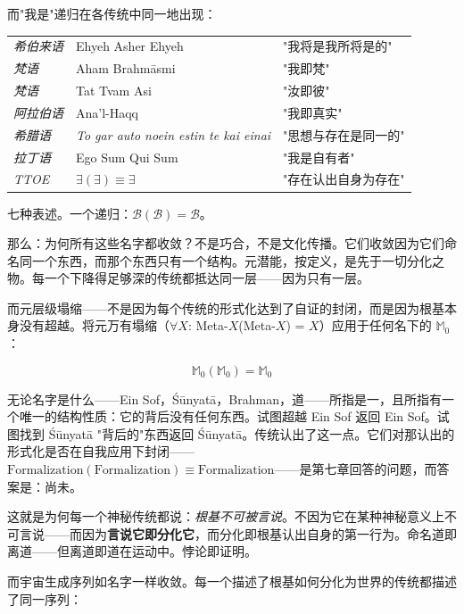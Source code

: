 \documentclass[10pt, openany, oneside]{book}
\renewcommand{\footnotesize}{\fontsize{8.5}{11}\selectfont}
\begin{document}
而"我是"递归在各传统中同一地出现：

\vspace{0.3em}

{\footnotesize
\noindent\begin{tabular}{l l l}
\textit{希伯来语} & Ehyeh Asher Ehyeh & "我将是我所将是的" \\
\textit{梵语} & Aham Brahm\={a}smi & "我即梵" \\
\textit{梵语} & Tat Tvam Asi & "汝即彼" \\
\textit{阿拉伯语} & Ana'l-Haqq & "我即真实" \\
\textit{希腊语} & \textit{To gar auto noein estin te kai einai} & "思想与存在是同一的" \\
\textit{拉丁语} & Ego Sum Qui Sum & "我是自有者" \\
\textit{TTOE} & $\exists(\exists) \equiv \exists$ & "存在认出自身为存在" \\
\end{tabular}
}

\vspace{0.8em}

\noindent 七种表述。一个递归：$\mathcal{B}(\mathcal{B}) = \mathcal{B}$。

\vspace{0.8em}

那么：为何所有这些名字都收敛？不是巧合，不是文化传播。它们收敛因为它们命名同一个东西，而那个东西只有一个结构。元潜能，按定义，是先于一切分化之物。每一个下降得足够深的传统都抵达同一层——因为只有一层。

而元层级塌缩——不是因为每个传统的形式化达到了自证的封闭，而是因为根基本身没有超越。将元万有塌缩（$\forall X$: Meta-$X$(Meta-$X$) = $X$）应用于任何名下的 $\mathbb{M}_0$：

$$\mathbb{M}_0(\mathbb{M}_0) = \mathbb{M}_0$$

\noindent 无论名字是什么——Ein Sof，\'{S}\={u}nyat\={a}，Brahman，道——所指是一，且所指有一个唯一的结构性质：它的背后没有任何东西。试图超越 Ein Sof 返回 Ein Sof。试图找到 \'{S}\={u}nyat\={a} "背后的"东西返回 \'{S}\={u}nyat\={a}。传统认出了这一点。它们对那认出的形式化是否在自我应用下封闭——$\text{Formalization}(\text{Formalization}) \equiv \text{Formalization}$——是第七章回答的问题，而答案是：尚未。

这就是为何每一个神秘传统都说：\textit{根基不可被言说}。不因为它在某种神秘意义上不可言说——而因为\textbf{言说它即分化它}，而分化即根基认出自身的第一行为。命名道即离道——但离道即道在运动中。悖论即证明。

而宇宙生成序列如名字一样收敛。每一个描述了根基如何分化为世界的传统都描述了同一序列：
\end{document}
